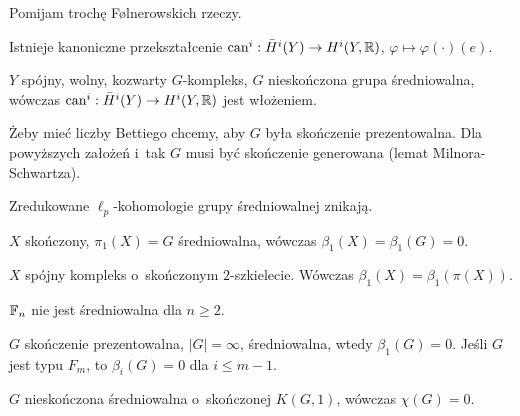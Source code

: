 

 


Pomijam trochę F\o{}lnerowskich rzeczy.

\begin{definicja}
	Istnieje kanoniczne przekształcenie
	${\mathrm{can}}^i: \bar{H}^i(Y) \to H^i(Y, {\mathbb{R}})$,
	$\varphi \mapsto \varphi(\cdot)(e)$.
\end{definicja}

\begin{lemat}
	$Y$ spójny, wolny, kozwarty $G$-kompleks, 
	$G$ nieskończona grupa średniowalna,
	wówczas ${\mathrm{can}}^i : \bar{H}^i(Y) \to H^i(Y, {\mathbb{R}})$
	jest włożeniem.
\end{lemat}

\begin{uwaga}
	Żeby mieć liczby Bettiego chcemy, aby $G$ była 
	skończenie prezentowalna.
	Dla powyższych założeń i~tak $G$ musi być skończenie generowana
	(lemat Milnora-Schwartza).
\end{uwaga}

\begin{hipoteza}[Gromov]
	Zredukowane $\ell_p$-kohomologie grupy średniowalnej znikają.
\end{hipoteza}

\begin{wniosek}
	$X$ skończony, $\pi_1(X) = G$ średniowalna,
	wówczas $\beta_1(X) = \beta_1(G) = 0$.
\end{wniosek}

\begin{stwierdzenie}
	$X$ spójny kompleks o~skończonym $2$-szkielecie.
	Wówczas $\beta_1(X) = \beta_1(\pi(X))$.
\end{stwierdzenie}

\begin{wniosek}
	${\mathbb{F}}_n$ nie jest średniowalna dla $n \geq 2$.
\end{wniosek}

\begin{twierdzenie}
	$G$ skończenie prezentowalna, $|G|= \infty$, średniowalna,
	wtedy $\beta_1(G) = 0$. Jeśli $G$ jest typu $F_m$,
	to $\beta_i(G) = 0$ dla $i \leq m-1$.
\end{twierdzenie}

\begin{wniosek}
	$G$ nieskończona średniowalna o~skończonej $K(G, 1)$,
	wówczas $\chi(G) = 0$.
\end{wniosek}

